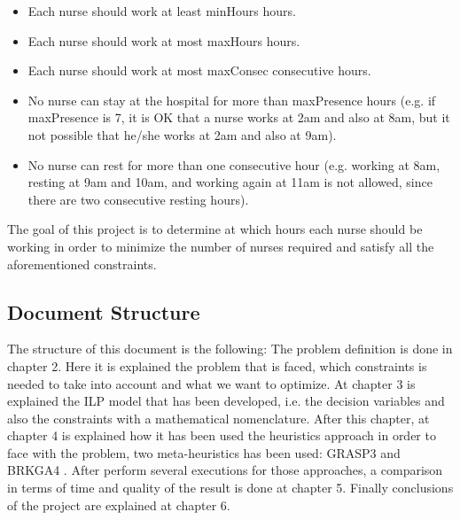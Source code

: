   \begin{itemize}
   \item Each nurse should work at least minHours hours.
   \item Each nurse should work at most maxHours hours.
   \item Each nurse should work at most maxConsec consecutive hours.
   \item No nurse can stay at the hospital for more than maxPresence hours (e.g. if maxPresence is 7, it is OK that a nurse works at 2am and also at 8am, but it not possible that he/she works at 2am and also at 9am).
   \item No nurse can rest for more than one consecutive hour (e.g. working at 8am, resting at 9am and 10am, and working again at 11am is not allowed, since there are two consecutive resting hours).
   \end{itemize}

The goal of this project is to determine at which hours each nurse should be working in order to minimize the number of nurses required and satisfy all the aforementioned constraints.

\subsection{Document Structure}

The structure of this document is the following: The problem definition is done in chapter 2. Here it is explained the problem that is faced, which constraints is needed to take into account and what we want to optimize. At chapter 3 is explained the ILP model that has been developed, i.e. the decision variables and also the constraints with a mathematical nomenclature. After this chapter, at chapter 4 is explained how it has been used the heuristics approach in order to face with the problem, two meta-heuristics has been used: GRASP3 and BRKGA4 . After perform several executions for those approaches, a comparison in terms of time and quality of the result is done at chapter 5. Finally conclusions of the project are explained at chapter 6.

 


\pagebreak
